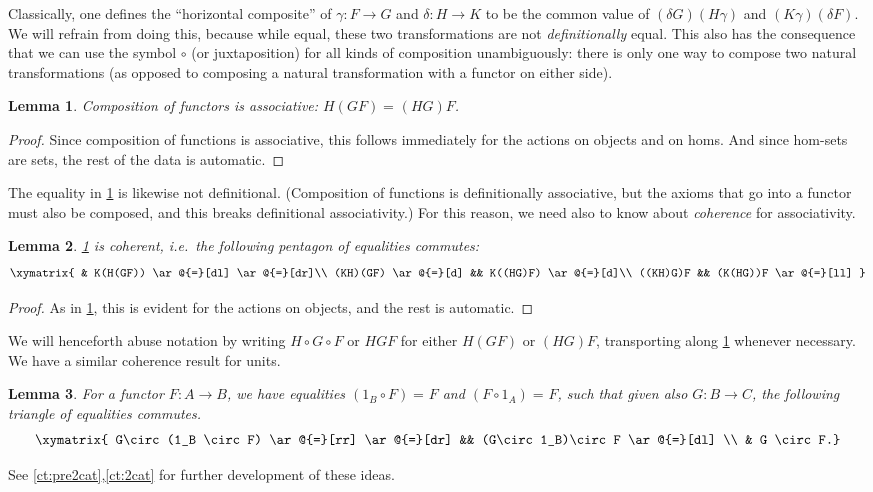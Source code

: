 \documentclass[12pt]{article}
\newcommand{\id}[3][]{\ensuremath{#2 =_{#1} #3}\xspace}
\newcounter{mathcount}
\newtheorem{prelem}{Lemma}
\newenvironment{lem}{\begin{prelem}}{\end{prelem}\addtocounter{mathcount}{1}}
\let\autoref\cref
\begin{document}
%
%
Classically, one defines the ``horizontal composite'' of $\gamma:F\to G$ and $\delta:H\to K$ to be the common value of ${(\delta G)(H\gamma)}$ and ${(K\gamma)(\delta F)}$.
We will refrain from doing this, because while equal, these two transformations are not \emph{definitionally} equal.
This also has the consequence that we can use the symbol $\circ$ (or juxtaposition) for all kinds of composition unambiguously: there is only one way to compose two natural transformations (as opposed to composing a natural transformation with a functor on either side).

\begin{lem}\label{ct:functor-assoc}
  Composition of functors is associative: $\id{H(GF)}{(HG)F}$.
\end{lem}
\begin{proof}
  Since composition of functions is associative, this follows immediately for the actions on objects and on homs.
  And since hom-sets are sets, the rest of the data is automatic.
\end{proof}

The equality in \autoref{ct:functor-assoc} is likewise not definitional.
(Composition of functions is definitionally associative, but the axioms that go into a functor must also be composed, and this breaks definitional associativity.)  For this reason, we need also to know about \emph{coherence} for associativity.

\begin{lem}\label{ct:pentagon}
  \autoref{ct:functor-assoc} is coherent, i.e.\ the following pentagon of equalities commutes:
  \[ \xymatrix{ & K(H(GF)) \ar@{=}[dl] \ar@{=}[dr]\\
    (KH)(GF) \ar@{=}[d] && K((HG)F) \ar@{=}[d]\\
    ((KH)G)F && (K(HG))F \ar@{=}[ll] }
  \]
\end{lem}
\begin{proof}
  As in \autoref{ct:functor-assoc}, this is evident for the actions on objects, and the rest is automatic.
\end{proof}

We will henceforth abuse notation by writing $H\circ G\circ F$ or $HGF$ for either $H(GF)$ or $(HG)F$, transporting along \autoref{ct:functor-assoc} whenever necessary.
We have a similar coherence result for units.

\begin{lem}\label{ct:units}
  For a functor $F:A\to B$, we have equalities $\id{(1_B\circ F)}{F}$ and $\id{(F\circ 1_A)}{F}$, such that given also $G:B\to C$, the following triangle of equalities commutes.
  \[ \xymatrix{
    G\circ (1_B \circ F) \ar@{=}[rr] \ar@{=}[dr] &&
    (G\circ 1_B)\circ F \ar@{=}[dl] \\
    & G \circ F.}
  \]
\end{lem}

See \autoref{ct:pre2cat},\autoref{ct:2cat} for further development of these ideas.
\end{document}
